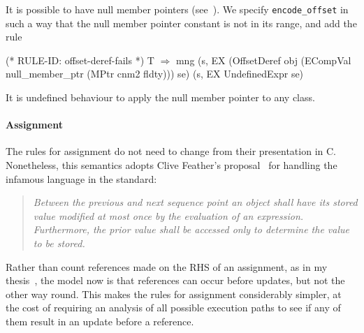 \documentclass[11pt]{article}
\begin{document}
It is possible to have null member pointers
(see~\cite[\S4.11]{cpp-standard-iso14882}).  We specify
\texttt{encode_offset} in such a way that the null member pointer
constant is not in its range, and add the rule
%
\begin{stdrule}
(* RULE-ID: offset-deref-fails *)
     T
   \(\Rightarrow\)
     mng (s, EX (OffsetDeref
                   obj
                   (ECompVal null_member_ptr (MPtr cnm2 fldty)))
                se)
         (s, EX UndefinedExpr se)
\end{stdrule}
It is undefined behaviour to apply the null member pointer to any
class.


\paragraph{Assignment}
\label{sec:assignment}
The rules for assignment do not need to change from their presentation
in C.  Nonetheless, this semantics adopts Clive
Feather's proposal~\cite{Feather2000} for
handling the infamous language in the standard:
\begin{quotation}
\itshape
    Between the previous and next sequence point an  object
    shall  have  its  stored  value modified at most once by the
    evaluation of an expression.  Furthermore, the  prior  value
    shall  be  accessed  only  to  determine  the  value  to  be
    stored.
\end{quotation}
Rather than count references made on the RHS of an assignment, as in
my thesis~\cite{Norrish98}, the model now is that references can occur
before updates, but not the other way round.  This makes the rules for
assignment considerably simpler, at the cost of requiring an analysis
of all possible execution paths to see if any of them result in an
update before a reference.
\end{document}
